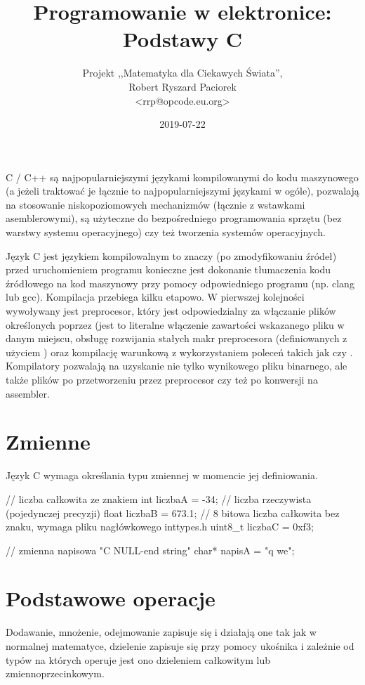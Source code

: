 \documentclass{pdfBooklets}
\title{Programowanie w elektronice: Podstawy C}
\author{%
	Projekt ,,Matematyka dla Ciekawych Świata'',\\
	Robert Ryszard Paciorek\\\normalsize\ttfamily <rrp@opcode.eu.org>
}
\date  {2019-07-22}
\begin{document}
\maketitle

C / C++ są najpopularniejszymi językami kompilowanymi do kodu maszynowego (a jeżeli traktować je łącznie to najpopularniejszymi językami w ogóle), pozwalają na stosowanie niskopoziomowych mechanizmów (łącznie z wstawkami asemblerowymi), są użyteczne do bezpośredniego programowania sprzętu (bez warstwy systemu operacyjnego) czy też tworzenia systemów operacyjnych.

Język C jest językiem kompilowalnym to znaczy (po zmodyfikowaniu źródeł) przed uruchomieniem programu konieczne jest dokonanie tłumaczenia kodu źródłowego na kod maszynowy przy pomocy odpowiedniego programu (np. clang lub gcc). Kompilacja przebiega kilku etapowo. W pierwszej kolejności wywoływany jest preprocesor, który jest odpowiedzialny za włączanie plików określonych poprzez  (jest to literalne włączenie zawartości wskazanego pliku w danym miejscu, obsługę rozwijania stałych makr preprocesora (definiowanych z użyciem ) oraz kompilację warunkową z wykorzystaniem poleceń takich jak  czy . Kompilatory pozwalają na uzyskanie nie tylko wynikowego pliku binarnego, ale także plików po przetworzeniu przez preprocesor czy też po konwersji na assembler.

\section{Zmienne}

Język C wymaga określania typu zmiennej w momencie jej definiowania.

\begin{CodeFrame*}[c]{}
// liczba całkowita ze znakiem
int     liczbaA = -34;
// liczba rzeczywista (pojedynczej precyzji)
float   liczbaB = 673.1;
// 8 bitowa liczba całkowita bez znaku, wymaga pliku nagłówkowego inttypes.h
uint8_t liczbaC = 0xf3;

// zmienna napisowa "C NULL-end string"
char* napisA = "q we";
\end{CodeFrame*}

\section{Podstawowe operacje}

Dodawanie, mnożenie, odejmowanie zapisuje się i działają one tak jak w normalnej matematyce, dzielenie zapisuje się przy pomocy ukośnika i zależnie od typów na których operuje jest ono dzieleniem całkowitym lub zmiennoprzecinkowym.
\end{document}
